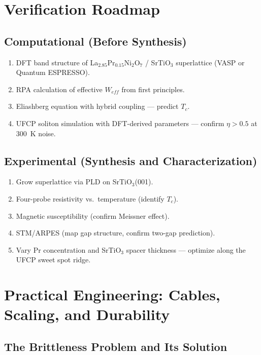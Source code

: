 \documentclass[11pt, a4paper]{article}
\begin{document}
\section{Verification Roadmap}

\subsection{Computational (Before Synthesis)}

\begin{enumerate}[nosep]
  \item DFT band structure of La$_{2.85}$Pr$_{0.15}$Ni$_2$O$_7$ /
        SrTiO$_3$ superlattice (VASP or Quantum ESPRESSO).
  \item RPA calculation of effective $W_{eff}$ from first principles.
  \item Eliashberg equation with hybrid coupling --- predict $T_c$.
  \item UFCP soliton simulation with DFT-derived parameters ---
        confirm $\eta > 0.5$ at 300~K noise.
\end{enumerate}

\subsection{Experimental (Synthesis and Characterization)}

\begin{enumerate}[nosep]
  \item Grow superlattice via PLD on SrTiO$_3$(001).
  \item Four-probe resistivity vs.\ temperature (identify $T_c$).
  \item Magnetic susceptibility (confirm Meissner effect).
  \item STM/ARPES (map gap structure, confirm two-gap prediction).
  \item Vary Pr concentration and SrTiO$_3$ spacer thickness ---
        optimize along the UFCP sweet spot ridge.
\end{enumerate}

\section{Practical Engineering: Cables, Scaling, and Durability}

\subsection{The Brittleness Problem and Its Solution}
\end{document}
